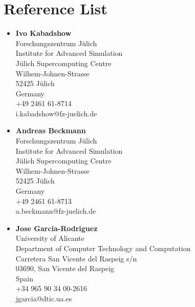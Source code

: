 \documentclass[8pt]{article}
\begin{document}
\section*{Reference List}
\begin{itemize}
  \item {\textbf{Ivo Kabadshow}\\
    Forschungszentrum Jülich\\
    Institute for Advanced Simulation\\
    Jülich Supercomputing Centre\\
    Wilhem-Johnen-Strasse\\
    52425 Jülich\\
    Germany\\
    +49 2461 61-8714\\
    i.kabadshow@fz-juelich.de\\}
  \item {\textbf{Andreas Beckmann}\\
    Forschungszentrum Jülich\\
    Institute for Advanced Simulation\\
    Jülich Supercomputing Centre\\
    Wilhem-Johnen-Strasse\\
    52425 Jülich\\
    Germany\\
    +49 2461 61-8713\\
    a.beckmann@fz-juelich.de\\}
  \item {\textbf{Jose Garcia-Rodriguez}\\
    University of Alicante\\
    Department of Computer Technology and Computation\\
    Carretera San Vicente del Raspeig s/n\\
    03690, San Vicente del Raspeig\\
    Spain\\
    +34 965 90 34 00-2616\\
    jgarcia@dtic.ua.es\\}

\end{itemize}
 
\end{document}
